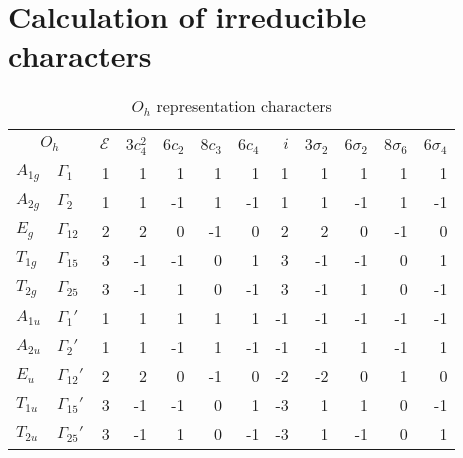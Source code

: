 \documentclass[preprint,showpacs,preprintnumbers,superscriptaddress,prb,floatfix,aps]{revtex4-1}
\newcommand*{\id}{\mathcal{E}}
\begin{document}
%
%
%
\section{Calculation of irreducible characters}

\begin{table}
\caption{\label{table:chi} $O_h$ representation characters}
\begin{ruledtabular}
\begin{tabular*}{10cm}{llrrrrrrrrrr}
\multicolumn{2}{c}{$O_h$}         &$\id$&3$c_4^2$& 6$c_2$ & 8$c_3$ & 6$c_4$ &  $i$ & 3$\sigma_2$ & 6$\sigma_2$ & 8$\sigma_6$ & 6$\sigma_4$ \\  
$A_{1g}$        & $\Gamma_{1}  $  &  1  &     1  &     1  &     1  &     1  &   1  &          1  &          1  &          1  &          1  \\         %
$A_{2g}$        & $\Gamma_{2}  $  &  1  &     1  &    -1  &     1  &    -1  &   1  &          1  &         -1  &          1  &         -1  \\         %
$E_g   $        & $\Gamma_{12} $  &  2  &     2  &     0  &    -1  &     0  &   2  &          2  &          0  &         -1  &          0  \\         %
$T_{1g}$        & $\Gamma_{15} $  &  3  &    -1  &    -1  &     0  &     1  &   3  &         -1  &         -1  &          0  &          1  \\         %
$T_{2g}$        & $\Gamma_{25} $  &  3  &    -1  &     1  &     0  &    -1  &   3  &         -1  &          1  &          0  &         -1  \\         %
$A_{1u}$        & $\Gamma_{1} '$  &  1  &     1  &     1  &     1  &     1  &  -1  &         -1  &         -1  &         -1  &         -1  \\         %
$A_{2u}$        & $\Gamma_{2} '$  &  1  &     1  &    -1  &     1  &    -1  &  -1  &         -1  &          1  &         -1  &          1  \\         %
$E_u   $        & $\Gamma_{12}'$  &  2  &     2  &     0  &    -1  &     0  &  -2  &         -2  &          0  &          1  &          0  \\         %
$T_{1u}$        & $\Gamma_{15}'$  &  3  &    -1  &    -1  &     0  &     1  &  -3  &          1  &          1  &          0  &         -1  \\         %
$T_{2u}$        & $\Gamma_{25}'$  &  3  &    -1  &     1  &     0  &    -1  &  -3  &          1  &         -1  &          0  &          1  \\ \hline  %

\end{tabular*}
\end{ruledtabular}
\end{table}
\end{document}
